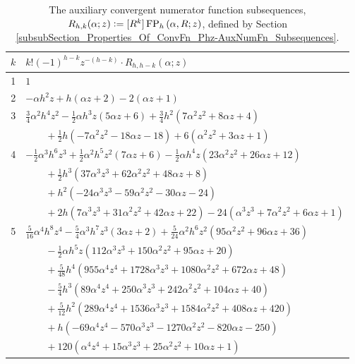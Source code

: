 \documentclass[12pt,reqno]{article}
\numberwithin{sfootnote}{section}
\newcommand{\tabletopstrut}[0]{\rule{0pt}{3ex}}
\numberwithin{equation}{section}
\theoremstyle{DefaultTheoremStyle}
\theoremstyle{definition}
\newcommand{\defequals}{\ensuremath{\vcentcolon=}}
\newcommand{\ConvFP}[4]{\ensuremath{\FP_{#1}\left(#2, #3; #4\right)}}
\DeclareMathOperator{\FP}{FP}
\begin{document}
\begin{table}[h]
\begin{subtable}{\textwidth}
\begin{tabular}{|c|l|}
\hline\tabletopstrut 
$k$ & $k! (-1)^{h-k} z^{-(h-k)} \cdot R_{h,h-k}(\alpha; z)$ \\ \hline 
1 & $1$ \\ 
2 & $-\alpha h^2 z+h (\alpha  z+2)-2 (\alpha  z+1)$ \\ 
3 & $\frac{3}{4} \alpha ^2 h^4 z^2- 
     \frac{1}{2} \alpha  h^3 z (5 \alpha  z+6)+ 
     \frac{3}{4} h^2 \left(7 \alpha ^2 z^2+8 \alpha  z+4\right)$ \\ 
  & $\qquad + 
     \frac{1}{2} h \left(-7 \alpha ^2 z^2-18 \alpha z- 
     18\right)+6 \left(\alpha ^2 z^2+3 \alpha  z+1\right)$ \\ 
4 & $-\frac{1}{2} \alpha ^3 h^6 z^3 + 
     \frac{1}{2} \alpha ^2 h^5 z^2 (7 \alpha  z+6) - 
     \frac{1}{2} \alpha  h^4 z \left(23 \alpha ^2 z^2+26 \alpha  z+12\right)$ \\ 
  & $\qquad + 
     \frac{1}{2} h^3 \left(37 \alpha ^3 z^3+62 \alpha ^2 z^2+ 
     48 \alpha  z+8\right)$ \\ 
  & $\qquad + 
     h^2 \left(-24 \alpha ^3 z^3-59 \alpha ^2 z^2-30 \alpha  z-24\right)$ \\ 
  & $\qquad + 
     2 h \left(7 \alpha ^3 z^3+31 \alpha ^2 z^2+42 \alpha  z+ 
     22\right)-24 \left(\alpha ^3 z^3+7 \alpha ^2 z^2+6 \alpha  z+1\right)$ \\ 
5 & $\frac{5}{16} \alpha ^4 h^8 z^4- 
     \frac{5}{4} \alpha ^3 h^7 z^3 (3 \alpha  z+2)+ 
     \frac{5}{24} \alpha ^2 h^6 z^2 \left(95 \alpha ^2 z^2+96 \alpha z+ 
     36\right)$ \\ 
  & $\qquad - 
     \frac{1}{2} \alpha  h^5 z \left(112 \alpha ^3 z^3+150 \alpha ^2 z^2+ 
     95 \alpha  z+20\right)$ \\ 
  & $\qquad + 
     \frac{5}{48} h^4 \left(955 \alpha ^4 z^4+1728 \alpha ^3 z^3+ 
     1080 \alpha ^2 z^2+672 \alpha  z+48\right)$ \\ 
  & $\qquad - 
     \frac{5}{4} h^3 \left(89 \alpha ^4 z^4+250 \alpha ^3 z^3+ 
     242 \alpha ^2 z^2+104 \alpha  z+40\right)$ \\ 
  & $\qquad + 
     \frac{5}{12} h^2 \left(289 \alpha ^4 z^4+1536 \alpha ^3 z^3+ 
     1584 \alpha ^2 z^2+408 \alpha  z+420\right)$ \\ 
  & $\qquad + 
     h \left(-69 \alpha ^4 z^4-570 \alpha ^3 z^3-1270 \alpha ^2 z^2- 
     820 \alpha  z-250\right)$ \\ 
  & $\qquad + 
     120 \left(\alpha ^4 z^4+15 \alpha ^3 z^3+25 \alpha ^2 z^2+ 
     10 \alpha  z+1\right)$ \\ \hline 
\hline 
\end{tabular} 

\end{subtable} 

\caption{The auxiliary convergent numerator function subsequences, 
         $R_{h,k}(\alpha; z) \defequals [R^k] \ConvFP{h}{\alpha}{R}{z}$, 
         defined by 
         Section \ref{subsubSection_Properties_Of_ConvFn_Phz-AuxNumFn_Subsequences}.}
\label{table_ConvNumFnSeqs_Rhk_Alphaz_SpCaseListings} 

\end{table} 
\end{document}
